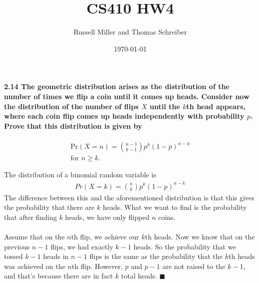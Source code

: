 \documentclass{article}
\title{CS410 HW4}
\author{Russell Miller and Thomas Schreiber}
\date{\today}
\begin{document}
\maketitle


\paragraph{2.14 The geometric distribution arises as the distribution of the 
number of times we flip a coin until it comes up heads. Consider now the 
distribution of the number of flips $X$ until the $k$th head appears, where 
each coin flip comes up heads independently with probability $p$. Prove that 
this distribution is given by}
\begin{eqnarray*}
\mbox{Pr}(X=n)={n-1 \choose k-1}p^k(1-p)^{n-k}\\
\mbox{for } n \geq k.
\end{eqnarray*}

The distribution of a binomial random variable is
\begin{eqnarray*}
Pr(X=k)={n\choose k}p^k(1-p)^{n-k}
\end{eqnarray*}
The difference between this and the aforementioned distribution is that this 
gives the probability that there are $k$ heads. What we want to find is the 
probability that after finding $k$ heads, we have only flipped $n$ coins.\\
\\
Assume that on the $n$th flip, we achieve our $k$th heads. Now we know that on 
the previous $n-1$ flips, we had exactly $k-1$ heads. So the probability that 
we tossed $k-1$ heads in $n-1$ flips is the same as the probability that the 
$k$th heads was achieved on the $n$th flip. However, $p$ and $p-1$ are not 
raised to the $k-1$, and that's because there are in fact $k$ total heads. 
$\blacksquare$
\end{document}
